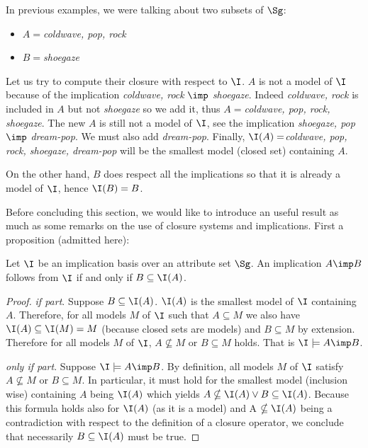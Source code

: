 \noindent In previous examples, we were talking about two subsets of $\Sg$:
\begin{itemize}
	\item $ A = $\textit{coldwave, pop, rock}
	\item $B = $\textit{shoegaze}
\end{itemize}

\noindent Let us try to compute their closure with respect to $\I$. $A$ is not
a model of $\I$ because of the implication \textit{coldwave, rock}  $\imp$ 
\textit{shoegaze}.  Indeed \textit{coldwave, rock} is included in $A$ but not
\textit{shoegaze} so we add it, thus $A = $\textit{coldwave, pop, 
rock, shoegaze}. The new $A$ is still not a model of $\I$, see the implication
\textit{shoegaze, pop} $\imp$ \textit{dream-pop}. We must also add 
\textit{dream-pop}. Finally, $\I(A) = $\textit{coldwave, pop, rock, 
shoegaze, dream-pop} will be the smallest model (closed set) containing $A$.

On the other hand, $B$ does respect all the implications so that it is already 
a model of $\I$, hence $\I(B) = B$.

\vspace{1.2em}

Before concluding this section, we would like to introduce an useful result as
much as some remarks on the use of closure systems and implications. First 
a proposition (admitted here):

\begin{proposition} \label{prop:def.equiv_imp_clos} 
Let $\I$ be an implication basis over an attribute set $\Sg$. An implication $A 
\imp B$ follows from $\I$ if and only if $B \subseteq \I(A)$.
\end{proposition}

\begin{proof} \textit{if part}. Suppose $B \subseteq \I(A)$. $\I(A)$ is the
smallest model of $\I$ containing $A$. Therefore, for all models $M$ of $\I$
such that $A \subseteq M$ we also have $\I(A) \subseteq \I(M) = M$ (because
closed sets are models) and $B \subseteq M$ by extension. Therefore for all
models $M$ of $\I$, $A \nsubseteq M$ or $B \subseteq M$ holds. That is 
$\I \models A \imp B$.

\vspace{1.2em}

\textit{only if part}. Suppose $\I \models A \imp B$. By definition, all models
$M$ of $\I$ satisfy $A \nsubseteq M$ or $B \subseteq M$. In particular, it must
hold for the smallest model (inclusion wise) containing $A$ being $\I(A)$ which
yields $A \nsubseteq \I(A) \lor B \subseteq \I(A)$. Because this formula holds 
also for $\I(A)$ (as it is a model) and A $\nsubseteq \I(A)$ being a 
contradiction with respect to the definition of a closure operator, we conclude 
that necessarily $B \subseteq \I(A)$ must be true.

\end{proof}


